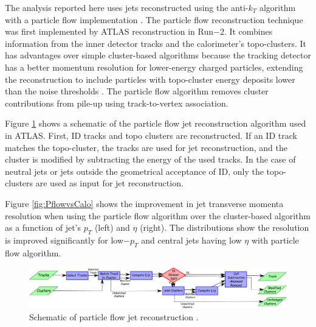 The analysis reported here uses jets reconstructed using the anti-$k_{T}$ algorithm with a particle flow implementation \cite{ParticleFlow}\cite{AntiKtAlgo}. The particle flow reconstruction technique was first implemented by ATLAS reconstruction in Run$-2$. It combines information from the inner detector tracks and the calorimeter's topo-clusters. It has advantages over simple cluster-based algorithms because the tracking detector has a better momentum resolution for lower-energy charged particles, extending the reconstruction to include particles with topo-cluster energy deposits lower than the noise thresholds \cite{ParticleFlow}. The particle flow algorithm removes cluster contributions from pile-up using track-to-vertex association.

Figure \ref{fig:PflowJets} shows a schematic of the particle flow jet reconstruction algorithm used in ATLAS. First, ID tracks and topo clusters are reconstructed. If an ID track matches the topo-cluster, the tracks are used for jet reconstruction, and the cluster is modified by subtracting the energy of the used tracks. In the case of neutral jets or jets outside the geometrical acceptance of ID, only the topo-clusters are used as input for jet reconstruction. 

Figure \ref{fig:PflowvsCalo} shows the improvement in jet transverse momenta resolution when using the particle flow algorithm over the cluster-based algorithm as a function of jet's $p_{T}$ (left) and $\eta$ (right). The distributions show the resolution is improved significantly for low$-p_{T}$ and central jets having low $\eta$ with particle flow algorithm.

\begin{figure}[!htb]
    \centering
    \includegraphics[width=0.99\linewidth]{figures/LHC/fig_02.png}
    \caption{ Schematic of particle flow jet reconstruction \cite{ParticleFlow}.\label{fig:PflowJets}}
\end{figure}

